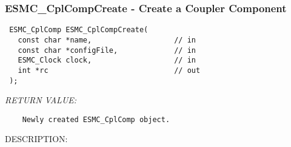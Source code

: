  
\setlength{\oldparskip}{\parskip}
\setlength{\parskip}{1.5ex}
\setlength{\oldparindent}{\parindent}
\setlength{\parindent}{0pt}
\setlength{\oldbaselineskip}{\baselineskip}
\setlength{\baselineskip}{11pt}
 
\def\bv{\begin{verbatim}}
\def\ev{\end{verbatim}}
\def\be{\begin{equation}}
\def\ee{\end{equation}}
\def\bea{\begin{eqnarray}}
\def\eea{\end{eqnarray}}
\def\bi{\begin{itemize}}
\def\ei{\end{itemize}}
\def\bn{\begin{enumerate}}
\def\en{\end{enumerate}}
\def\bd{\begin{description}}
\def\ed{\end{description}}
\def\({\left (}
\def\){\right )}
\def\[{\left [}
\def\]{\right ]}
\def\<{\left  \langle}
\def\>{\right \rangle}
\def\cI{{\cal I}}
\def\diag{\mathop{\rm diag}}
\def\tr{\mathop{\rm tr}}


 
\subsubsection [ESMC\_CplCompCreate] {ESMC\_CplCompCreate - Create a Coupler Component}


  
\begin{verbatim} ESMC_CplComp ESMC_CplCompCreate(
   const char *name,                   // in
   const char *configFile,             // in
   ESMC_Clock clock,                   // in
   int *rc                             // out
 );\end{verbatim}{\em RETURN VALUE:}
\begin{verbatim}    Newly created ESMC_CplComp object.\end{verbatim}
{\sf DESCRIPTION:\\ }


